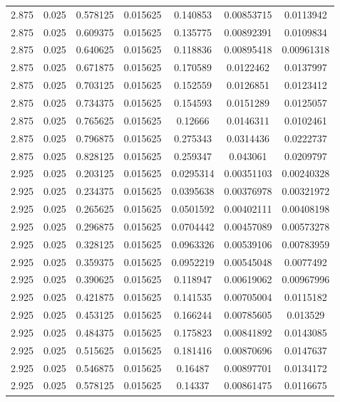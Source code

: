 \begin{table}[bh]
\begin{center}
{\begin{tabular}{ccccccc}
2.875	 & 0.025 & 	0.578125	 & 0.015625	 & 0.140853	 & 0.00853715	 & 0.0113942 \\ 
2.875	 & 0.025 & 	0.609375	 & 0.015625	 & 0.135775	 & 0.00892391	 & 0.0109834 \\ 
2.875	 & 0.025 & 	0.640625	 & 0.015625	 & 0.118836	 & 0.00895418	 & 0.00961318 \\ 
2.875	 & 0.025 & 	0.671875	 & 0.015625	 & 0.170589	 & 0.0122462	 & 0.0137997 \\ 
2.875	 & 0.025 & 	0.703125	 & 0.015625	 & 0.152559	 & 0.0126851	 & 0.0123412 \\ 
2.875	 & 0.025 & 	0.734375	 & 0.015625	 & 0.154593	 & 0.0151289	 & 0.0125057 \\ 
2.875	 & 0.025 & 	0.765625	 & 0.015625	 & 0.12666	 & 0.0146311	 & 0.0102461 \\ 
2.875	 & 0.025 & 	0.796875	 & 0.015625	 & 0.275343	 & 0.0314436	 & 0.0222737 \\ 
2.875	 & 0.025 & 	0.828125	 & 0.015625	 & 0.259347	 & 0.043061	 & 0.0209797 \\ 
2.925	 & 0.025 & 	0.203125	 & 0.015625	 & 0.0295314	 & 0.00351103	 & 0.00240328 \\ 
2.925	 & 0.025 & 	0.234375	 & 0.015625	 & 0.0395638	 & 0.00376978	 & 0.00321972 \\ 
2.925	 & 0.025 & 	0.265625	 & 0.015625	 & 0.0501592	 & 0.00402111	 & 0.00408198 \\ 
2.925	 & 0.025 & 	0.296875	 & 0.015625	 & 0.0704442	 & 0.00457089	 & 0.00573278 \\ 
2.925	 & 0.025 & 	0.328125	 & 0.015625	 & 0.0963326	 & 0.00539106	 & 0.00783959 \\ 
2.925	 & 0.025 & 	0.359375	 & 0.015625	 & 0.0952219	 & 0.00545048	 & 0.0077492 \\ 
2.925	 & 0.025 & 	0.390625	 & 0.015625	 & 0.118947	 & 0.00619062	 & 0.00967996 \\ 
2.925	 & 0.025 & 	0.421875	 & 0.015625	 & 0.141535	 & 0.00705004	 & 0.0115182 \\ 
2.925	 & 0.025 & 	0.453125	 & 0.015625	 & 0.166244	 & 0.00785605	 & 0.013529 \\ 
2.925	 & 0.025 & 	0.484375	 & 0.015625	 & 0.175823	 & 0.00841892	 & 0.0143085 \\ 
2.925	 & 0.025 & 	0.515625	 & 0.015625	 & 0.181416	 & 0.00870696	 & 0.0147637 \\ 
2.925	 & 0.025 & 	0.546875	 & 0.015625	 & 0.16487	 & 0.00897701	 & 0.0134172 \\ 
2.925	 & 0.025 & 	0.578125	 & 0.015625	 & 0.14337	 & 0.00861475	 & 0.0116675 \\ 

\end{tabular}}
\end{center}
\end{table}
